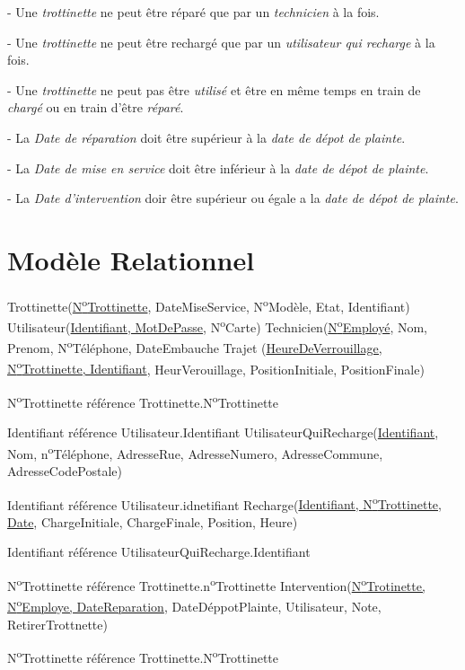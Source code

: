 \documentclass{article}
\newcommand\tab[1][1cm]{\hspace*{#1}}
\begin{document}
- Une \textit{trottinette} ne peut être réparé que par un \textit{technicien} à la fois.

- Une \textit{trottinette} ne peut être rechargé que par un \textit{utilisateur qui recharge} à la fois.

- Une \textit{trottinette} ne peut pas être \textit{utilisé} et être en même temps en train de \textit{chargé} ou en train d'être \textit{réparé}.

- La \textit{Date de réparation} doit être supérieur à la \textit{date de dépot de plainte}.

- La \textit{Date de mise en service} doit être inférieur à la \textit{date de dépot de plainte}.

- La \textit{Date d'intervention} doir être supérieur ou égale a la \textit{date de dépot de plainte}.


\section{Modèle Relationnel}
Trottinette(\underline{N\textsuperscript{o}Trottinette}, DateMiseService, N\textsuperscript{o}Modèle, Etat, Identifiant)
\bigbreak
Utilisateur(\underline{Identifiant, MotDePasse}, N\textsuperscript{o}Carte)
\bigbreak
Technicien(\underline{N\textsuperscript{o}Employé}, Nom, Prenom, N\textsuperscript{o}Téléphone, DateEmbauche
\bigbreak
Trajet (\underline{HeureDeVerrouillage, N\textsuperscript{o}Trottinette, Identifiant}, HeurVerouillage, PositionInitiale, PositionFinale)

\tab N\textsuperscript{o}Trottinette référence Trottinette.N\textsuperscript{o}Trottinette

\tab Identifiant référence Utilisateur.Identifiant
\bigbreak
UtilisateurQuiRecharge(\underline{Identifiant}, Nom, n\textsuperscript{o}Téléphone, AdresseRue, AdresseNumero, AdresseCommune, AdresseCodePostale)

\tab Identifiant référence Utilisateur.idnetifiant
\bigbreak
Recharge(\underline{Identifiant, N\textsuperscript{o}Trottinette, Date}, ChargeInitiale, ChargeFinale, Position, Heure)

\tab Identifiant référence UtilisateurQuiRecharge.Identifiant

\tab N\textsuperscript{o}Trottinette référence Trottinette.n\textsuperscript{o}Trottinette
 \bigbreak
 Intervention(\underline{N\textsuperscript{o}Trotinette, N\textsuperscript{o}Employe, DateReparation}, DateDéppotPlainte, Utilisateur, Note, RetirerTrottnette)
 
 \tab N\textsuperscript{o}Trottinette référence Trottinette.N\textsuperscript{o}Trottinette
 
\end{document}
